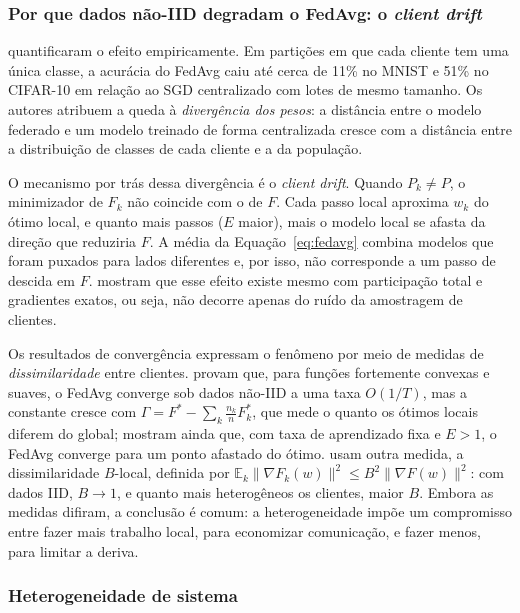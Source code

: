 \subsubsection{Por que dados não-IID degradam o FedAvg: o \textit{client drift}}

\citet{zhao2018noniid} quantificaram o efeito empiricamente. Em partições em que cada cliente tem uma única classe, a acurácia do FedAvg caiu até cerca de 11\% no MNIST e 51\% no CIFAR-10 em relação ao SGD centralizado com lotes de mesmo tamanho. Os autores atribuem a queda à \emph{divergência dos pesos}: a distância entre o modelo federado e um modelo treinado de forma centralizada cresce com a distância entre a distribuição de classes de cada cliente e a da população.

O mecanismo por trás dessa divergência é o \textit{client drift}. Quando $P_k \neq P$, o minimizador de $F_k$ não coincide com o de $F$. Cada passo local aproxima $w_k$ do ótimo local, e quanto mais passos ($E$ maior), mais o modelo local se afasta da direção que reduziria $F$. A média da Equação~\eqref{eq:fedavg} combina modelos que foram puxados para lados diferentes e, por isso, não corresponde a um passo de descida em $F$. \citet{karimireddy2020scaffold} mostram que esse efeito existe mesmo com participação total e gradientes exatos, ou seja, não decorre apenas do ruído da amostragem de clientes.

Os resultados de convergência expressam o fenômeno por meio de medidas de \emph{dissimilaridade} entre clientes. \citet{li2020convergence} provam que, para funções fortemente convexas e suaves, o FedAvg converge sob dados não-IID a uma taxa $O(1/T)$, mas a constante cresce com $\Gamma = F^\ast - \sum_k \frac{n_k}{n} F_k^\ast$, que mede o quanto os ótimos locais diferem do global; mostram ainda que, com taxa de aprendizado fixa e $E > 1$, o FedAvg converge para um ponto afastado do ótimo. \citet{li2020fedprox} usam outra medida, a dissimilaridade $B$-local, definida por $\mathbb{E}_k \lVert \nabla F_k(w)\rVert^2 \leq B^2 \lVert \nabla F(w)\rVert^2$: com dados IID, $B \to 1$, e quanto mais heterogêneos os clientes, maior $B$. Embora as medidas difiram, a conclusão é comum: a heterogeneidade impõe um compromisso entre fazer mais trabalho local, para economizar comunicação, e fazer menos, para limitar a deriva.

\subsubsection{Heterogeneidade de sistema}

